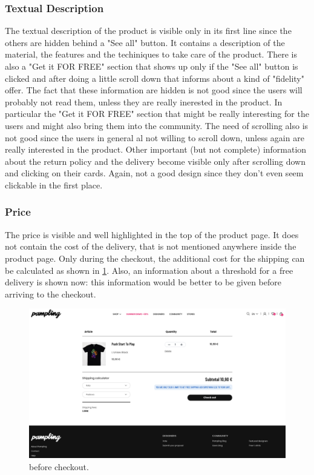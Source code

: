 \subsubsection{Textual Description}
The textual description of the product is visible only in its first line since the others are hidden 
behind a "See all" button. 
It contains a description of the material, the features and the techiniques
to take care of the product. 
There is also a "Get it FOR FREE" section that shows up only if the "See all" button is clicked and after
doing a little scroll down that informs about a kind of "fidelity" offer.
The fact that these information are hidden is not good since the users will probably not read them,
unless they are really inerested in the product. In particular the "Get it FOR FREE" section that 
might be really interesting for the users and might also bring them into the community.
The need of scrolling also is not good since the users in general al not willing to scroll down, 
unless again are really interested in the product.
Other important (but not complete) information about the return policy and the delivery become visible
only after scrolling down and clicking on their cards. Again, not a good design since they don't even
seem clickable in the first place. 


\subsubsection{Price}
The price is visible and well highlighted in the top of the product page. 
It does not contain the cost of the delivery, that is not mentioned anywhere inside the product page.
Only during the checkout, the additional cost for the shipping can be calculated as shown in \cref{fig:checkout-1}.
Also, an information about a threshold for a free delivery is shown now: this information would 
be better to be given before arriving to the checkout. 
\begin{figure}[H]
	\centering
	\includegraphics[scale=0.225]{images/checkout1.png}
	\caption{before checkout.}
	\label{fig:checkout-1}
\end{figure}


